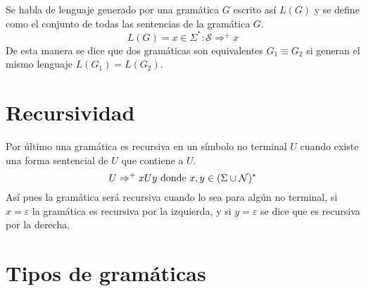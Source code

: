 Se habla de lenguaje generado por una gramática $G$ escrito así $L(G)$ y se define como el conjunto de todas las sentencias de la gramática $G$.  \[L(G) = x\in \Sigma^{*}:\mathcal{S} \Rightarrow^{+}x\]
De esta manera se dice que dos gramáticas son equivalentes $G_{1} \equiv G_{2}$ si generan el mismo lenguaje $L(G_{1})=L(G_{2})$.

\section{Recursividad}

Por último una gramática es recursiva en un símbolo no terminal $U$ cuando existe una forma sentencial de $U$ que contiene a $U$. \[U \Rightarrow^{+}xUy \textup{ donde } x,y\in (\Sigma \cup \mathcal{N})^{*} \]
Así pues la gramática será recursiva cuando lo sea para algún no terminal, si $x = \varepsilon$ la gramática es recursiva por la izquierda, y si $y = \varepsilon$ se dice que es recursiva por la derecha.

\section{Tipos de gramáticas }

